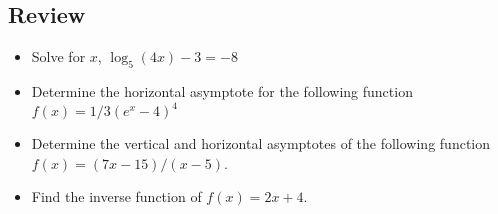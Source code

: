 \documentclass[../main-exe.tex]{subfiles}
\begin{document}
\subsection{Review}

\begin{itemize}
    \item Solve for $x$, $\log_5(4x)-3=-8$
    \item Determine the horizontal asymptote for the following function $f(x)=1/3(e^x-4)^4$
    \item Determine the vertical and horizontal asymptotes of the following function $f(x) = (7x-15)/(x-5)$.
    \item Find the inverse function of $f(x)=2x+4$.
\end{itemize}
\end{document}
